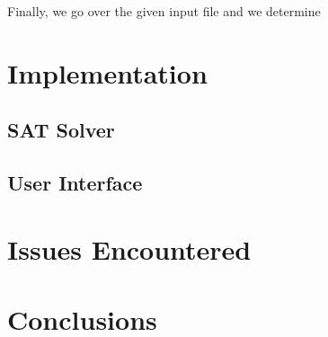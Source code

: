 \documentclass[12pt]{article}
\begin{document}
Finally, we go over the given input file and we determine

\section{Implementation}

\subsection{SAT Solver}

\subsection{User Interface}

\section{Issues Encountered}
\label{section:issues}

\section{Conclusions}
\end{document}
